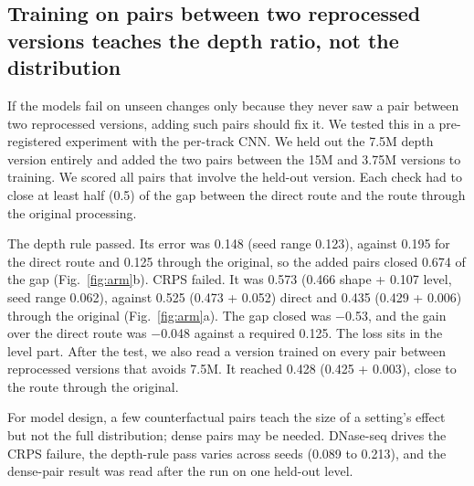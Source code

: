 \documentclass[pdflatex,sn-mathphys-num]{sn-jnl}
\newcommand{\lit}[1]{#1}
\newcommand{\armOneRule}{0.148}
\newcommand{\armOneRuleS}{0.123}
\newcommand{\armRefRule}{0.195}
\newcommand{\armViaRule}{0.125}
\newcommand{\cFourBar}{0.125}
\newcommand{\cFourGainChk}{\ensuremath{-}0.048}
\newcommand{\cFourGap}{\ensuremath{-}0.53}
\newcommand{\cOneGap}{0.674}
\newcommand{\crArm}{0.573}
\newcommand{\crArmOS}{0.466}
\newcommand{\crArmS}{0.062}
\newcommand{\crArmSE}{0.107}
\newcommand{\crArmTwo}{0.428}
\newcommand{\crArmTwoOS}{0.425}
\newcommand{\crArmTwoSE}{0.003}
\newcommand{\crRef}{0.525}
\newcommand{\crRefOS}{0.473}
\newcommand{\crRefSE}{0.052}
\newcommand{\crVia}{0.435}
\newcommand{\crViaOS}{0.429}
\newcommand{\crViaSE}{0.006}
\newcommand{\lawSeedHi}{0.213}
\newcommand{\lawSeedLo}{0.089}
\begin{document}
\subsection{Training on pairs between two reprocessed versions teaches the depth ratio, not the distribution}\label{sec:r7}

If the models fail on unseen changes only because they never saw a pair between two
reprocessed versions, adding such pairs should fix it. We tested this in a pre-registered
experiment with the per-track CNN. We held out the \lit{7.5}M depth version entirely and added
the two pairs between the \lit{15}M and \lit{3.75}M versions to training. We scored all pairs
that involve the held-out version. Each check had to close at least half (\lit{0.5}) of the gap
between the direct route and the route through the original processing.

The depth rule passed. Its error was \armOneRule{} (seed range \armOneRuleS{}), against
\armRefRule{} for the direct route and \armViaRule{} through the original, so the added pairs
closed \cOneGap{} of the gap (Fig.~\ref{fig:arm}b). CRPS failed. It was \crArm{} (\crArmOS{}
shape + \crArmSE{} level, seed range \crArmS{}), against \crRef{} (\crRefOS{} + \crRefSE{}) direct
and \crVia{} (\crViaOS{} + \crViaSE{}) through the original (Fig.~\ref{fig:arm}a). The gap closed
was \cFourGap{}, and the gain over the direct route was \cFourGainChk{} against a required
\cFourBar{}. The loss sits in the level part. After the test, we also read a version trained on
every pair between reprocessed versions that avoids \lit{7.5}M. It reached \crArmTwo{}
(\crArmTwoOS{} + \crArmTwoSE{}), close to the route through the original.

For model design, a few counterfactual pairs teach the size of a setting's effect but not the
full distribution; dense pairs may be needed. DNase-seq drives the CRPS failure, the depth-rule
pass varies across seeds (\lawSeedLo{} to \lawSeedHi{}), and the dense-pair result was read
after the run on one held-out level.
\end{document}
